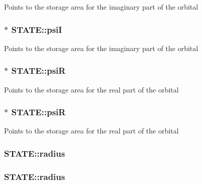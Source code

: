 Points to the storage area for the imaginary part of the orbital \hypertarget{struct_s_t_a_t_e_a307aadd23efc5ec92832ae4a2b4f3879}{
\subsubsection[{psi\-I}]{$\ast$ S\-T\-A\-T\-E\-::psi\-I}}\label{struct_s_t_a_t_e_a307aadd23efc5ec92832ae4a2b4f3879}
Points to the storage area for the imaginary part of the orbital \hypertarget{struct_s_t_a_t_e_a58b00a9a0c47eea5abf002ec2897b925}{
\subsubsection[{psi\-R}]{ $\ast$ S\-T\-A\-T\-E\-::psi\-R}}\label{struct_s_t_a_t_e_a58b00a9a0c47eea5abf002ec2897b925}
Points to the storage area for the real part of the orbital \hypertarget{struct_s_t_a_t_e_a5f40d64d60783c247093e94937cd89f5}{
\subsubsection[{psi\-R}]{$\ast$ S\-T\-A\-T\-E\-::psi\-R}}\label{struct_s_t_a_t_e_a5f40d64d60783c247093e94937cd89f5}
Points to the storage area for the real part of the orbital \hypertarget{struct_s_t_a_t_e_a6516e948ae5dfa73df2b3f750be5aef0}{
\subsubsection[{radius}]{ S\-T\-A\-T\-E\-::radius}}\label{struct_s_t_a_t_e_a6516e948ae5dfa73df2b3f750be5aef0}
\hypertarget{struct_s_t_a_t_e_a6834a98b192e37641c49a174fcaff845}{
\subsubsection[{radius}]{ S\-T\-A\-T\-E\-::radius}}\label{struct_s_t_a_t_e_a6834a98b192e37641c49a174fcaff845}
